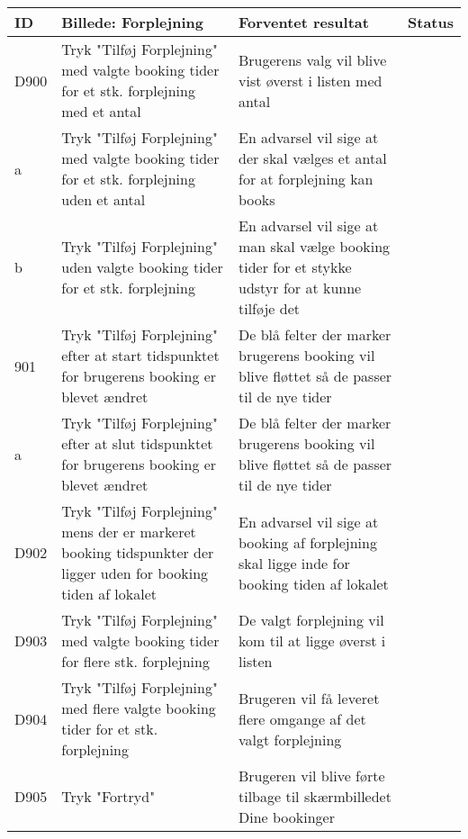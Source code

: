 \begin{tabularx}{\textwidth}{ |X|X|X|X| }
\hline
	ID & Billede: Forplejning  & Forventet resultat & Status\\ 
\hline
	D900 & Tryk "Tilføj Forplejning" med valgte booking tider for et stk. forplejning med et antal & Brugerens valg vil blive vist øverst i listen med antal & \\
\hline
	a & Tryk "Tilføj Forplejning" med valgte booking tider for et stk. forplejning uden et antal & En advarsel vil sige at der skal vælges et antal for at forplejning kan books & \\
\hline
	b & Tryk "Tilføj Forplejning" uden valgte booking tider for et stk. forplejning & En advarsel vil sige at man skal vælge booking tider for et stykke udstyr for at kunne tilføje det & \\
\hline
	901 & Tryk "Tilføj Forplejning" efter at start tidspunktet for brugerens booking er blevet ændret & De blå felter der marker brugerens booking vil blive fløttet så de passer til de nye tider & \\
\hline
	a & Tryk "Tilføj Forplejning" efter at slut tidspunktet for brugerens booking er blevet ændret & De blå felter der marker brugerens booking vil blive fløttet så de passer til de nye tider & \\
\hline
	D902 & Tryk "Tilføj Forplejning" mens der er markeret booking tidspunkter der ligger uden for booking tiden af lokalet & En advarsel vil sige at booking af forplejning skal ligge inde for booking tiden af lokalet & \\
\hline
	D903 & Tryk "Tilføj Forplejning" med valgte booking tider for flere stk. forplejning & De valgt forplejning vil kom til at ligge øverst i listen & \\
\hline
	D904 & Tryk "Tilføj Forplejning" med flere valgte booking tider for et stk. forplejning & Brugeren vil få leveret flere omgange af det valgt forplejning & \\
\hline
	D905 & Tryk "Fortryd" & Brugeren vil blive førte tilbage til skærmbilledet Dine bookinger & \\
\hline
\end{tabularx}

